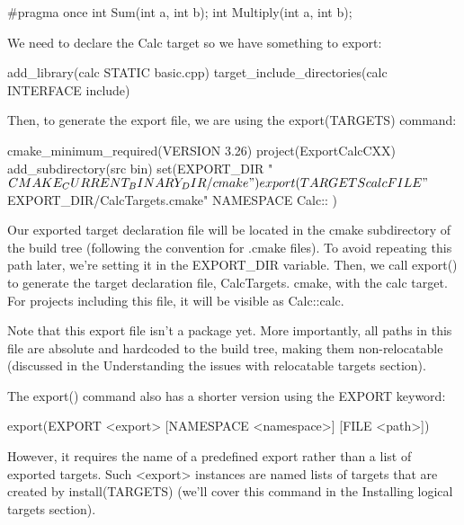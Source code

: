 
\begin{cpp}
#pragma once
int Sum(int a, int b);
int Multiply(int a, int b);
\end{cpp}

We need to declare the Calc target so we have something to export:


\begin{cmake}
add_library(calc STATIC basic.cpp)
target_include_directories(calc INTERFACE include)
\end{cmake}

Then, to generate the export file, we are using the export(TARGETS) command:


\begin{cmake}
cmake_minimum_required(VERSION 3.26)
project(ExportCalcCXX)
add_subdirectory(src bin)
set(EXPORT_DIR "${CMAKE_CURRENT_BINARY_DIR}/cmake")
export(TARGETS calc
    FILE "${EXPORT_DIR}/CalcTargets.cmake"
    NAMESPACE Calc::
)
\end{cmake}

Our exported target declaration file will be located in the cmake subdirectory of the build tree (following the convention for .cmake files). To avoid repeating this path later, we’re setting it in the EXPORT\_DIR variable. Then, we call export() to generate the target declaration file, CalcTargets. cmake, with the calc target. For projects including this file, it will be visible as Calc::calc.

Note that this export file isn’t a package yet. More importantly, all paths in this file are absolute and hardcoded to the build tree, making them non-relocatable (discussed in the Understanding the issues with relocatable targets section).

The export() command also has a shorter version using the EXPORT keyword:

\begin{shell}
export(EXPORT <export> [NAMESPACE <namespace>] [FILE <path>])
\end{shell}

However, it requires the name of a predefined export rather than a list of exported targets. Such <export> instances are named lists of targets that are created by install(TARGETS) (we’ll cover this command in the Installing logical targets section).

